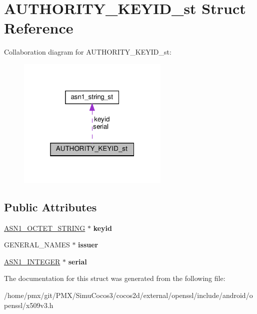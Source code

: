 \hypertarget{structAUTHORITY__KEYID__st}{}\section{A\+U\+T\+H\+O\+R\+I\+T\+Y\+\_\+\+K\+E\+Y\+I\+D\+\_\+st Struct Reference}
\label{structAUTHORITY__KEYID__st}


Collaboration diagram for A\+U\+T\+H\+O\+R\+I\+T\+Y\+\_\+\+K\+E\+Y\+I\+D\+\_\+st\+:
\nopagebreak
\begin{figure}[H]
\begin{center}
\leavevmode
\includegraphics[width=205pt]{structAUTHORITY__KEYID__st__coll__graph}
\end{center}
\end{figure}
\subsection*{Public Attributes}
\begin{DoxyCompactItemize}
\item 
\mbox{\label{structAUTHORITY__KEYID__st_a1000865b4139c5d41fc7a552369303a1}} 
\hyperlink{structasn1__string__st}{A\+S\+N1\+\_\+\+O\+C\+T\+E\+T\+\_\+\+S\+T\+R\+I\+NG} $\ast$ {\bfseries keyid}
\item 
\mbox{\label{structAUTHORITY__KEYID__st_adc7bdad6f72942b1d7b6a09fcafc6295}} 
G\+E\+N\+E\+R\+A\+L\+\_\+\+N\+A\+M\+ES $\ast$ {\bfseries issuer}
\item 
\mbox{\label{structAUTHORITY__KEYID__st_a00b5cb0f50f2fe1e950072fbf454acf7}} 
\hyperlink{structasn1__string__st}{A\+S\+N1\+\_\+\+I\+N\+T\+E\+G\+ER} $\ast$ {\bfseries serial}
\end{DoxyCompactItemize}


The documentation for this struct was generated from the following file\+:\begin{DoxyCompactItemize}
\item 
/home/pmx/git/\+P\+M\+X/\+Simu\+Cocos3/cocos2d/external/openssl/include/android/openssl/x509v3.\+h\end{DoxyCompactItemize}
